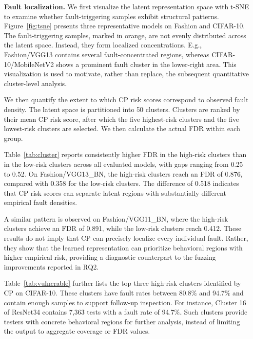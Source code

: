 \documentclass[preprint,number,5p,twocolumn]{elsarticle}
\begin{document}
\textbf{Fault localization.} We first visualize the latent representation space with t-SNE to examine whether fault-triggering samples exhibit structural patterns. Figure~\ref{fig:tsne} presents three representative models on Fashion and CIFAR-10. The fault-triggering samples, marked in orange, are not evenly distributed across the latent space. Instead, they form localized concentrations. E.g., Fashion/VGG13 contains several fault-concentrated regions, whereas CIFAR-10/MobileNetV2 shows a prominent fault cluster in the lower-right area. This visualization is used to motivate, rather than replace, the subsequent quantitative cluster-level analysis.

We then quantify the extent to which CP risk scores correspond to observed fault density. The latent space is partitioned into 50 clusters. Clusters are ranked by their mean CP risk score, after which the five highest-risk clusters and the five lowest-risk clusters are selected. We then calculate the actual FDR within each group.

Table~\ref{tab:cluster} reports consistently higher FDR in the high-risk clusters than in the low-risk clusters across all evaluated models, with gaps ranging from 0.25 to 0.52. On Fashion/VGG13\_BN, the high-risk clusters reach an FDR of 0.876, compared with 0.358 for the low-risk clusters. The difference of 0.518 indicates that CP risk scores can separate latent regions with substantially different empirical fault densities.

A similar pattern is observed on Fashion/VGG11\_BN, where the high-risk clusters achieve an FDR of 0.891, while the low-risk clusters reach 0.412. These results do not imply that CP can precisely localize every individual fault. Rather, they show that the learned representation can prioritize behavioral regions with higher empirical risk, providing a diagnostic counterpart to the fuzzing improvements reported in RQ2.

Table~\ref{tab:vulnerable} further lists the top three high-risk clusters identified by CP on CIFAR-10. These clusters have fault rates between 80.8\% and 94.7\% and contain enough samples to support follow-up inspection. For instance, Cluster 16 of ResNet34 contains 7,363 tests with a fault rate of 94.7\%. Such clusters provide testers with concrete behavioral regions for further analysis, instead of limiting the output to aggregate coverage or FDR values.
\end{document}
